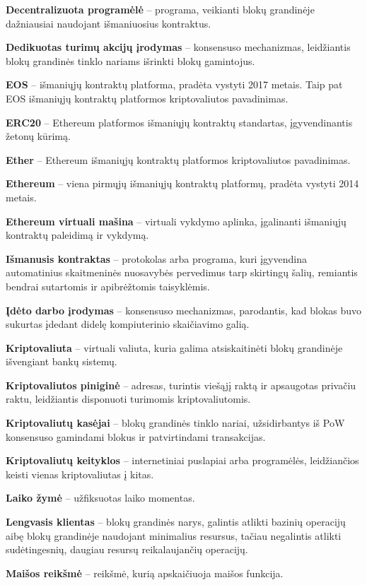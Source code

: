 \documentclass{VUMIFPSkursinis}
\begin{document}
\textbf{Decentralizuota programėlė} – programa, veikianti blokų grandinėje dažniausiai naudojant išmaniuosius kontraktus.

\textbf{Dedikuotas turimų akcijų įrodymas} – konsensuso mechanizmas, leidžiantis blokų grandinės tinklo nariams išrinkti blokų gamintojus.

\textbf{EOS} – išmaniųjų kontraktų platforma, pradėta vystyti 2017 metais. Taip pat EOS išmaniųjų kontraktų platformos kriptovaliutos pavadinimas.

\textbf{ERC20} – Ethereum platformos išmaniųjų kontraktų standartas, įgyvendinantis žetonų kūrimą.

\textbf{Ether} – Ethereum išmaniųjų kontraktų platformos kriptovaliutos pavadinimas.

\textbf{Ethereum} – viena pirmųjų išmaniųjų kontraktų platformų, pradėta vystyti 2014 metais. 

\textbf{Ethereum virtuali mašina} – virtuali vykdymo aplinka, įgalinanti išmaniųjų kontraktų paleidimą ir vykdymą.

\textbf{Išmanusis kontraktas} – protokolas arba programa, kuri įgyvendina automatinius skaitmeninės nuosavybės pervedimus tarp skirtingų šalių, remiantis bendrai sutartomis ir apibrėžtomis taisyklėmis.

\textbf{Įdėto darbo įrodymas} – konsensuso mechanizmas, parodantis, kad blokas buvo sukurtas įdedant didelę kompiuterinio skaičiavimo galią.

\textbf{Kriptovaliuta} – virtuali valiuta, kuria galima atsiskaitinėti blokų grandinėje išvengiant bankų sistemų.

\textbf{Kriptovaliutos piniginė} – adresas, turintis viešąjį raktą ir apsaugotas privačiu raktu, leidžiantis disponuoti turimomis kriptovaliutomis.

\textbf{Kriptovaliutų kasėjai} – blokų grandinės tinklo nariai, užsidirbantys iš PoW konsensuso gamindami blokus ir patvirtindami transakcijas.

\textbf{Kriptovaliutų keityklos} – internetiniai puslapiai arba programėlės, leidžiančios keisti vienas kriptovaliutas į kitas.

\textbf{Laiko žymė} – užfiksuotas laiko momentas.

\textbf{Lengvasis klientas} – blokų grandinės narys, galintis atlikti bazinių operacijų aibę blokų grandinėje naudojant minimalius resursus, tačiau negalintis atlikti sudėtingesnių, daugiau resursų reikalaujančių operacijų.

\textbf{Maišos reikšmė} – reikšmė, kurią apskaičiuoja maišos funkcija.
\end{document}
